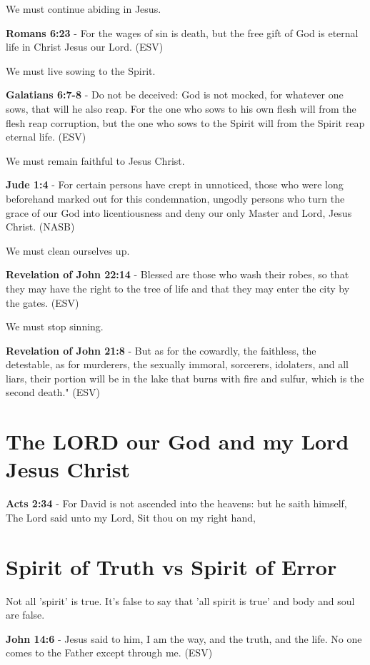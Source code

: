 \documentclass[11pt]{article}
\begin{document}
We must continue abiding in Jesus.

\textbf{Romans 6:23} -  For the wages of sin is death, but the free gift of God is eternal life in Christ Jesus our Lord.  (ESV)

We must live sowing to the Spirit.

\textbf{Galatians 6:7-8} - Do not be deceived: God is not mocked, for whatever one sows, that will he also reap. For the one who sows to his own flesh will from the flesh reap corruption, but the one who sows to the Spirit will from the Spirit reap eternal life.  (ESV)

We must remain faithful to Jesus Christ.

\textbf{Jude 1:4} - For certain persons have crept in unnoticed, those who were long beforehand marked out for this condemnation, ungodly persons who turn the grace of our God into licentiousness and deny our only Master and Lord, Jesus Christ.  (NASB)

We must clean ourselves up.

\textbf{Revelation of John 22:14} - Blessed are those who wash their robes, so that they may have the right to the tree of life and that they may enter the city by the gates. (ESV)

We must stop sinning.

\textbf{Revelation of John 21:8} - But as for the cowardly, the faithless, the detestable, as for murderers, the sexually immoral, sorcerers, idolaters, and all liars, their portion will be in the lake that burns with fire and sulfur, which is the second death."  (ESV)

\section{The LORD our God and my Lord Jesus Christ}
\label{sec:org4e2545f}
\textbf{Acts 2:34} - For David is not ascended into the heavens: but he saith himself, The Lord said unto my Lord, Sit thou on my right hand,

\section{Spirit of Truth vs Spirit of Error}
\label{sec:orgf19f6d6}
Not all 'spirit' is true.
It's false to say that 'all spirit is true' and body and soul are false.

\textbf{John 14:6} - Jesus said to him, I am the way, and the truth, and the life.  No one comes to the Father except through me.  (ESV)
\end{document}
